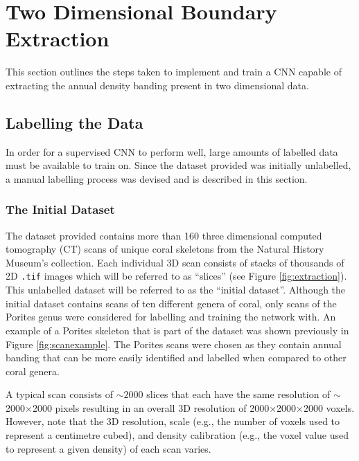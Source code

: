 \section{Two Dimensional Boundary Extraction}

This section outlines the steps taken to implement and train a CNN capable of extracting the annual density banding present in two dimensional data.

\subsection{Labelling the Data}
\label{sec:2dlabel}

In order for a supervised CNN to perform well, large amounts of labelled data must be available to train on. Since the dataset provided was initially unlabelled, a manual labelling process was devised and is described in this section.

\subsubsection{The Initial Dataset}

The dataset provided contains more than 160 three dimensional computed tomography (CT) scans of unique coral skeletons from the Natural History Museum's collection. Each individual 3D scan consists of stacks of thousands of 2D \texttt{.tif} images which will be referred to as ``slices'' (see Figure \ref{fig:extraction}). This unlabelled dataset will be referred to as the ``initial dataset''. Although the initial dataset contains scans of ten different genera of coral, only scans of the Porites genus were considered for labelling and training the network with. An example of a Porites skeleton that is part of the dataset was shown previously in Figure \ref{fig:scanexample}. The Porites scans were chosen as they contain annual banding that can be more easily identified and labelled when compared to other coral genera.

A typical scan consists of ${\sim}2000$ slices that each have the same resolution of ${\sim}$2000$\times$2000 pixels resulting in an overall 3D resolution of 2000$\times$2000$\times$2000 voxels. However, note that the 3D resolution, scale (e.g., the number of voxels used to represent a centimetre cubed), and density calibration (e.g., the voxel value used to represent a given density) of each scan varies.


